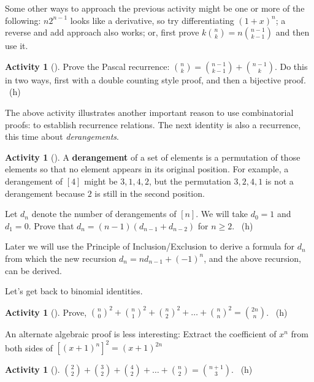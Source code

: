 \documentclass[10pt,]{book}
\newcommand{\terminology}[1]{\textbf{#1}}
\theoremstyle{plain}
\theoremstyle{definition}
\theoremstyle{definition}
\theoremstyle{definition}
\newtheorem{activity}[project]{Activity}
\numberwithin{equation}{chapter}
\begin{document}
\hypertarget{p-697}{}%
Some other ways to approach the previous activity might be one or more of the following: \(n2^{n - 1}\) looks like a derivative, so try differentiating \(\left( 1 + x \right)^{n}\); a reverse and add approach also works; or, first prove \(k \binom{n}{k} = n \binom{n - 1}{k - 1}\) and then use it.%
\begin{activity}[]\label{activity-92}
\hypertarget{p-698}{}%
Prove the Pascal recurrence: \(\binom{n}{k} = \binom{n - 1}{k-1} + \binom{n - 1}{k}\).  Do this in two ways, first with a double counting style proof, and then a bijective proof.%
~{\tiny (h)}\end{activity}
\hypertarget{p-701}{}%
The above activity illustrates another important reason to use combinatorial proofs: to establish recurrence relations.  The next identity is also a recurrence, this time about \emph{derangements}.%
\begin{activity}[]\label{activity-93}
\hypertarget{p-702}{}%
A \terminology{derangement} of a set of elements is a permutation of those elements so that no element appears in its original position.  For example, a derangement of \([4]\) might be \(3,1,4,2\), but the permutation \(3,2,4,1\) is not a derangement because \(2\) is still in the second position.%
\par
\hypertarget{p-703}{}%
Let \(d_{n}\) denote the number of derangements of \([n]\).  We will take \(d_{0} = 1\) and \(d_{1} = 0\).  Prove that \(d_{n} = (n - 1)(d_{n - 1}+ d_{n - 2})\) for \(n \geq 2\).%
~{\tiny (h)}\end{activity}
\hypertarget{p-706}{}%
Later we will use the Principle of Inclusion/Exclusion to derive a formula for \(d_{n}\) from which the new recursion \(d_{n} = nd_{n - 1} + \left( - 1 \right)^{n}\), and the above recursion, can be derived.%
\par
\hypertarget{p-707}{}%
Let's get back to binomial identities.%
\begin{activity}[]\label{activity-94}
\hypertarget{p-708}{}%
Prove, \(\binom{n}{0}^{2} + \binom{n}{1}^{2} + \binom{n}{2}^{2} + \ldots + \binom{n}{n}^{2} = \binom{2n}{n}\).%
~{\tiny (h)}\end{activity}
\hypertarget{p-711}{}%
An alternate algebraic proof is less interesting: Extract the coefficient of \(x^{n}\) from both sides of \(\left\lbrack \left( x + 1 \right)^{n} \right\rbrack^{2} = \left(x + 1 \right)^{2n}\)%
\begin{activity}[]\label{activity-95}
\hypertarget{p-712}{}%
\(\binom{2}{2} + \binom{3}{2} + \binom{4}{2} + \ldots + \binom{n}{2} = \binom{n + 1}{3}\).%
~{\tiny (h)}\end{activity}
\end{document}
